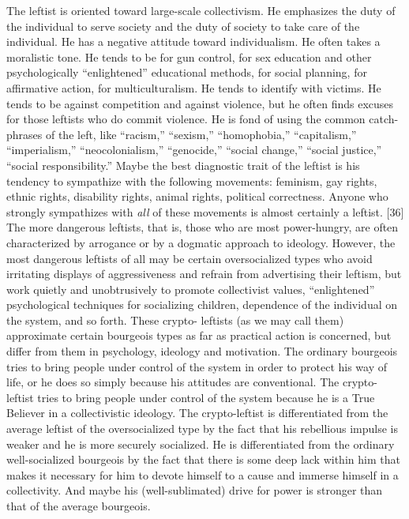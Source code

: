  The leftist is oriented toward large-scale collectivism. He emphasizes the duty of the individual to serve society and the duty of society to take care of the individual. He has a negative attitude toward individualism. He often takes a moralistic tone. He tends to be for gun control, for sex education and other psychologically “enlightened” educational methods, for social planning, for affirmative action, for multiculturalism. He tends to identify with victims. He tends to be against competition and against violence, but he often finds excuses for those leftists who do commit violence. He is fond of using the common catch- phrases of the left, like “racism,” “sexism,” “homophobia,” “capitalism,” “imperialism,” “neocolonialism,” “genocide,” “social change,” “social justice,” “social responsibility.” Maybe the best diagnostic trait of the leftist is his tendency to sympathize with the following movements: feminism, gay rights, ethnic rights, disability rights, animal rights, political correctness. Anyone who strongly sympathizes with {\em all} of these movements is almost certainly a leftist. [36]
 The more dangerous leftists, that is, those who are most power-hungry, are often characterized by arrogance or by a dogmatic approach to ideology. However, the most dangerous leftists of all may be certain oversocialized types who avoid irritating displays of aggressiveness and refrain from advertising their leftism, but work quietly and unobtrusively to promote collectivist values, “enlightened” psychological techniques for socializing children, dependence of the individual on the system, and so forth. These crypto- leftists (as we may call them) approximate certain bourgeois types as far as practical action is concerned, but differ from them in psychology, ideology and motivation. The ordinary bourgeois tries to bring people under control of the system in order to protect his way of life, or he does so simply because his attitudes are conventional. The crypto-leftist tries to bring people under control of the system because he is a True Believer in a collectivistic ideology. The crypto-leftist is differentiated from the average leftist of the oversocialized type by the fact that his rebellious impulse is weaker and he is more securely socialized. He is differentiated from the ordinary well-socialized bourgeois by the fact that there is some deep lack within him that makes it necessary for him to devote himself to a cause and immerse himself in a collectivity. And maybe his (well-sublimated) drive for power is stronger than that of the average bourgeois.

